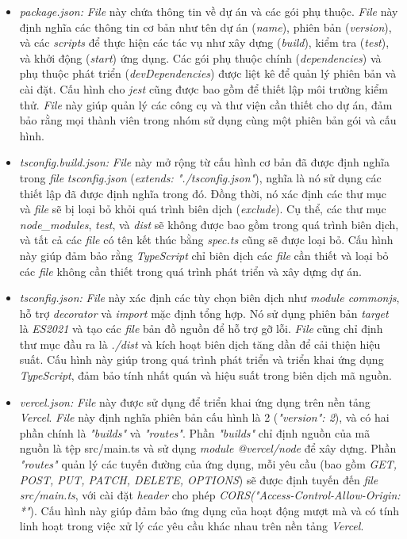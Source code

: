 \begin{itemize}
    \item \textit{package.json:} \textit{File} này chứa thông tin về dự án và các gói phụ thuộc. \textit{File} này định nghĩa các thông tin cơ bản như tên dự án (\textit{name}), phiên bản (\textit{version}), và các \textit{scripts} để thực hiện các tác vụ như xây dựng (\textit{build}), kiểm tra (\textit{test}), và khởi động (\textit{start}) ứng dụng. Các gói phụ thuộc chính (\textit{dependencies}) và phụ thuộc phát triển (\textit{devDependencies}) được liệt kê để quản lý phiên bản và cài đặt. Cấu hình cho \textit{jest} cũng được bao gồm để thiết lập môi trường kiểm thử. \textit{File} này giúp quản lý các công cụ và thư viện cần thiết cho dự án, đảm bảo rằng mọi thành viên trong nhóm sử dụng cùng một phiên bản gói và cấu hình.
    \item \textit{tsconfig.build.json:} \textit{File} này mở rộng từ cấu hình cơ bản đã được định nghĩa trong \textit{file} \textit{tsconfig.json} (\textit{extends: "./tsconfig.json"}), nghĩa là nó sử dụng các thiết lập đã được định nghĩa trong đó. Đồng thời, nó xác định các thư mục và \textit{file} sẽ bị loại bỏ khỏi quá trình biên dịch (\textit{exclude}). Cụ thể, các thư mục \textit{node\_modules}, \textit{test}, và \textit{dist} sẽ không được bao gồm trong quá trình biên dịch, và tất cả các \textit{file} có tên kết thúc bằng \textit{spec.ts} cũng sẽ được loại bỏ. Cấu hình này giúp đảm bảo rằng \textit{TypeScript} chỉ biên dịch các \textit{file} cần thiết và loại bỏ các \textit{file} không cần thiết trong quá trình phát triển và xây dựng dự án.
    \item \textit{tsconfig.json:} \textit{File} này xác định các tùy chọn biên dịch như \textit{module commonjs}, hỗ trợ \textit{decorator} và \textit{import} mặc định tổng hợp. Nó sử dụng phiên bản \textit{target} là \textit{ES2021} và tạo các \textit{file} bản đồ nguồn để hỗ trợ gỡ lỗi. \textit{File} cũng chỉ định thư mục đầu ra là \textit{./dist} và kích hoạt biên dịch tăng dần để cải thiện hiệu suất. Cấu hình này giúp trong quá trình phát triển và triển khai ứng dụng \textit{TypeScript}, đảm bảo tính nhất quán và hiệu suất trong biên dịch mã nguồn.
    \item \textit{vercel.json:} \textit{File} này được sử dụng để triển khai ứng dụng trên nền tảng \textit{Vercel}. \textit{File} này định nghĩa phiên bản cấu hình là 2 (\textit{"version": 2}), và có hai phần chính là \textit{"builds"} và \textit{"routes"}. Phần \textit{"builds"} chỉ định nguồn của mã nguồn là tệp src/main.ts và sử dụng \textit{module @vercel/node} để xây dựng. Phần \textit{"routes"} quản lý các tuyến đường của ứng dụng, mỗi yêu cầu (bao gồm \textit{GET, POST, PUT, PATCH, DELETE, OPTIONS}) sẽ được định tuyến đến \textit{file src/main.ts}, với cài đặt \textit{header} cho phép \textit{CORS("Access-Control-Allow-Origin: *"}). Cấu hình này giúp đảm bảo ứng dụng của hoạt động mượt mà và có tính linh hoạt trong việc xử lý các yêu cầu khác nhau trên nền tảng \textit{Vercel}.
\end{itemize}
